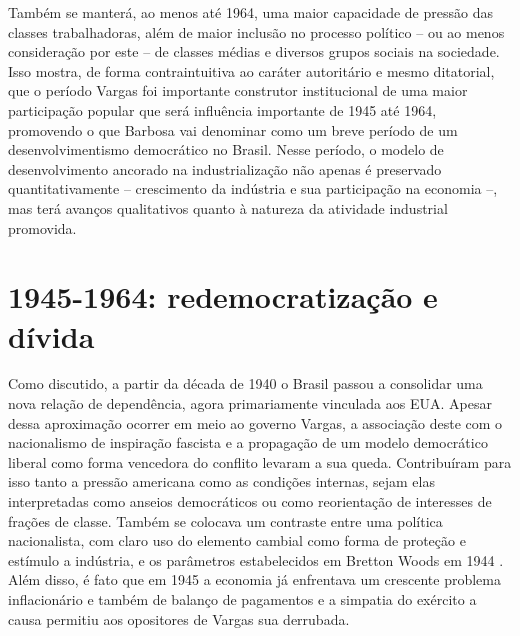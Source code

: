 Também se manterá, ao menos até 1964, uma maior capacidade de pressão das
classes trabalhadoras, além de maior inclusão no processo político
-- ou ao menos consideração por este -- de classes médias e
diversos grupos sociais na sociedade. Isso mostra, de forma contraintuitiva ao
caráter autoritário e mesmo ditatorial, que o período Vargas foi
importante construtor institucional de uma maior participação popular
que será influência importante de 1945 até 1964, promovendo o que
Barbosa \citep{barbosa_developmentalist_2020} vai denominar como um breve período de um
desenvolvimentismo democrático no Brasil. Nesse período, o modelo de
desenvolvimento ancorado na industrialização não apenas é preservado
quantitativamente -- crescimento da indústria e sua participação na
economia --, mas terá avanços qualitativos quanto à natureza da
atividade industrial promovida.

\section{1945-1964: redemocratização e dívida}\label{redemocratizauxe7uxe3o-e-duxedvida}

Como discutido, a partir da década de 1940 o Brasil passou a consolidar
uma nova relação de dependência, agora primariamente vinculada aos EUA. Apesar dessa
aproximação ocorrer em meio ao governo Vargas, a associação deste com o
nacionalismo de inspiração fascista e a propagação de um modelo
democrático liberal como forma vencedora do conflito levaram a sua
queda. Contribuíram para isso tanto a pressão americana 
como as condições internas, sejam elas interpretadas como anseios
democráticos \citep{schwarcz_brasil_2015} ou como reorientação de interesses de frações de
classe. Também se colocava um contraste entre uma política nacionalista,
com claro uso do elemento cambial como forma de proteção e estímulo a
indústria, e os parâmetros estabelecidos em Bretton Woods em 1944 . Além
disso, é fato que em 1945 a economia já enfrentava um crescente problema
inflacionário e também de balanço de pagamentos  e
a simpatia do exército a causa permitiu aos opositores de Vargas sua
derrubada.

